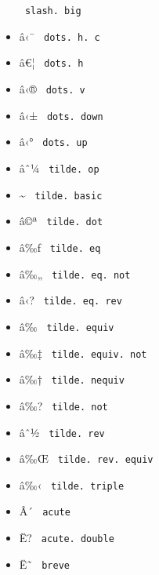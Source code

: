 \begin{itemize}
{  \texttt{\ slash.\ big\ }}
\item
  \label{symbol-dots.h.c}{{ â‹¯ }
  \texttt{\ dots.\ h.\ c\ }}
\item
  \label{symbol-dots.h}{{ â€¦ } \texttt{\ dots.\ h\ }}
\item
  \label{symbol-dots.v}{{ â‹® } \texttt{\ dots.\ v\ }}
\item
  \label{symbol-dots.down}{{ â‹± }
  \texttt{\ dots.\ down\ }}
\item
  \label{symbol-dots.up}{{ â‹° } \texttt{\ dots.\ up\ }}
\item
  \label{symbol-tilde.op}{{ âˆ¼ }
  \texttt{\ tilde.\ op\ }}
\item
  \label{symbol-tilde.basic}{{ \textasciitilde{} }
  \texttt{\ tilde.\ basic\ }}
\item
  \label{symbol-tilde.dot}{{ â©ª }
  \texttt{\ tilde.\ dot\ }}
\item
  \label{symbol-tilde.eq}{{ â‰ƒ }
  \texttt{\ tilde.\ eq\ }}
\item
  \label{symbol-tilde.eq.not}{{ â‰„ }
  \texttt{\ tilde.\ eq.\ not\ }}
\item
  \label{symbol-tilde.eq.rev}{{ â‹? }
  \texttt{\ tilde.\ eq.\ rev\ }}
\item
  \label{symbol-tilde.equiv}{{ â‰ }
  \texttt{\ tilde.\ equiv\ }}
\item
  \label{symbol-tilde.equiv.not}{{ â‰‡ }
  \texttt{\ tilde.\ equiv.\ not\ }}
\item
  \label{symbol-tilde.nequiv}{{ â‰† }
  \texttt{\ tilde.\ nequiv\ }}
\item
  \label{symbol-tilde.not}{{ â‰? }
  \texttt{\ tilde.\ not\ }}
\item
  \label{symbol-tilde.rev}{{ âˆ½ }
  \texttt{\ tilde.\ rev\ }}
\item
  \label{symbol-tilde.rev.equiv}{{ â‰Œ }
  \texttt{\ tilde.\ rev.\ equiv\ }}
\item
  \label{symbol-tilde.triple}{{ â‰‹ }
  \texttt{\ tilde.\ triple\ }}
\item
  \label{symbol-acute}{{ Â´ } \texttt{\ acute\ }}
\item
  \label{symbol-acute.double}{{ Ë? }
  \texttt{\ acute.\ double\ }}
\item
  \label{symbol-breve}{{ Ë˜ } \texttt{\ breve\ }}

\end{itemize}
